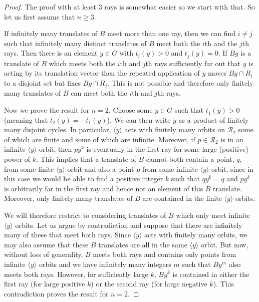 \documentclass[11pt,a4paper]{amsart}
\theoremstyle{definition}
\theoremstyle{remark}
\newcommand{\Ra}{\mathcal{R}}
\begin{document}
\begin{proof} 
The proof with at least 3 rays is somewhat easier so we start with that. So let us first assume that $n \geq 3$. 	
	
If infinitely many translates of $B$ meet more than one ray, then we can find $i\ne j$ such that infinitely many distinct translates of $B$ meet both the $i$th and the $j$th rays.
Then there is an element $y\in G$ with $t_i(y)>0 $ and $t_j(y)=0$. If $Bg$ is a translate of $B$ which meets both the $i$th and $j$th rays sufficiently far out that $y$ is acting by its translation vector then the repeated application of $y$ moves $Bg\cap R_i$ to a disjoint set but fixes $Bg\cap R_j$. This is not possible and therefore only finitely many translates of $B$ can meet both the $i$th and $j$th rays.

Now we prove the result for $n=2$. Choose some $y \in G$ such that $t_1(y) > 0$ (meaning that $t_2(y) = -t_1(y)$). We can then write $y$ as a product of finitely many disjoint cycles. In particular, $\langle y \rangle$ acts with finitely many orbits on $\Ra_2$ some of which are finite and some of which are infinite. Moreover, if $p \in \Ra_2$ is in an infinite $\langle y \rangle$ orbit, then $py^k$ is eventually in the first ray for some large (positive) power of $k$. This implies that a translate of $B$ cannot both contain a point, $q$, from some finite $\langle y \rangle$  orbit and also a point $p$ from some infinite $\langle y \rangle$  orbit, since in this case we would be able to find a positive integer $k$ such that $q y^k = q$ and $py^k$ is arbitrarily far in the first ray and hence not an element of this $B$ translate. Moreover, only finitely many translates of $B$ are contained in the finite $\langle y \rangle$ orbits. 

We will therefore restrict to considering translates of $B$ which only meet infinite $\langle y \rangle$  orbits. Let us argue by contradiction and suppose that there are infinitely many of these that meet both rays. Since $\langle y \rangle$  acts with finitely many orbits, we may also assume that these $B$ translates are all in the same $\langle y \rangle$ orbit. But now, without loss of generality, $B$ meets both rays and contains only points from infinite $\langle y \rangle$  orbits and we have infinitely many integers $m$ such that $By^{m}$ also meets both rays. However, for sufficiently large $k$, $By^k$ is contained in either the first ray (for large positive $k$) or the second ray (for large negative $k$). This contradiction proves the result for $n=2$.
\end{proof}
\end{document}
